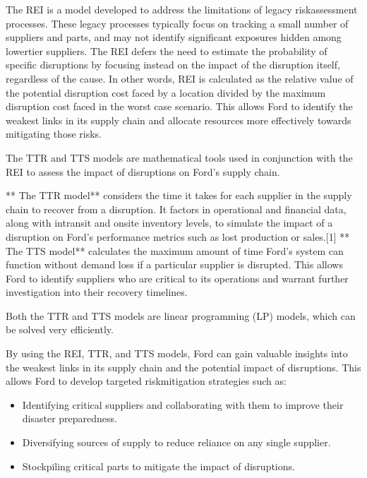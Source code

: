 \documentclass[letterpaper,10pt,english]{jupyterBook}
\begin{document}
\sphinxAtStartPar
{}

\sphinxAtStartPar
The REI is a model developed to address the limitations of legacy risk\sphinxhyphen{}assessment processes. These legacy processes typically focus on tracking a small number of suppliers and parts, and may not identify significant exposures hidden among lower\sphinxhyphen{}tier suppliers. The REI defers the need to estimate the probability of specific disruptions by focusing instead on the impact of the disruption itself, regardless of the cause. In other words, REI is calculated as the relative value of the potential disruption cost faced by a location divided by the maximum disruption cost faced in the worst case scenario. This allows Ford to identify the weakest links in its supply chain and allocate resources more effectively towards mitigating those risks.

\sphinxAtStartPar
{}

\sphinxAtStartPar
The TTR and TTS models are mathematical tools used in conjunction with the REI to assess the impact of disruptions on Ford’s supply chain.

\sphinxAtStartPar
** \sphinxhyphen{} The TTR model** considers the time it takes for each supplier in the supply chain to recover from a disruption. It factors in operational and financial data, along with in\sphinxhyphen{}transit and on\sphinxhyphen{}site inventory levels, to simulate the impact of a disruption on Ford’s performance metrics such as lost production or sales.{[}1{]}
** \sphinxhyphen{} The TTS model** calculates the maximum amount of time Ford’s system can function without demand loss if a particular supplier is disrupted. This allows Ford to identify suppliers who are critical to its operations and warrant further investigation into their recovery timelines.

\sphinxAtStartPar
Both the TTR and TTS models are linear programming (LP) models, which can be solved very efficiently.

\sphinxAtStartPar
{}

\sphinxAtStartPar
By using the REI, TTR, and TTS models, Ford can gain valuable insights into the weakest links in its supply chain and the potential impact of disruptions. This allows Ford to develop targeted risk\sphinxhyphen{}mitigation strategies such as:
\begin{itemize}
\item {} 
\sphinxAtStartPar
Identifying critical suppliers and collaborating with them to improve their disaster preparedness.

\item {} 
\sphinxAtStartPar
Diversifying sources of supply to reduce reliance on any single supplier.

\item {} 
\sphinxAtStartPar
Stockpiling critical parts to mitigate the impact of disruptions.

\end{itemize}
\end{document}
